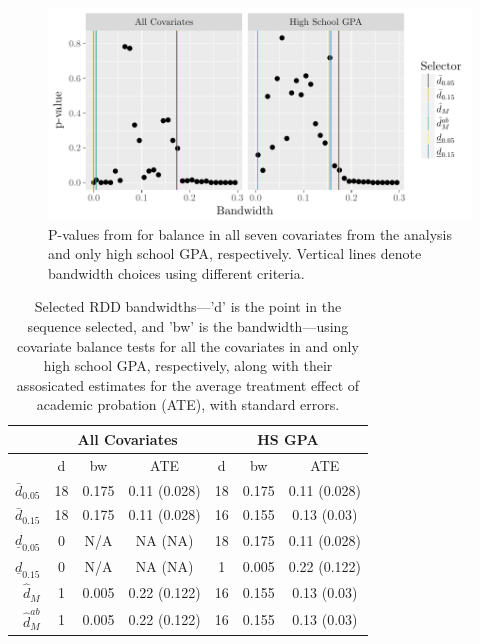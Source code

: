 \documentclass[sts]{imsart}\usepackage[]{graphicx}\usepackage[]{color}
\makeatletter
\def\maxwidth{ %
  \ifdim\Gin@nat@width>\linewidth
    \linewidth
  \else
    \Gin@nat@width
  \fi
}
\newenvironment{knitrout}{}{} %
\newcommand{\dhatm}{\hat{d}_M}
\newcommand{\dhatmab}{\hat{d}^{ab}_M}
\makeatother
\begin{document}
\begin{figure}
\begin{knitrout}
\color{fgcolor}
\includegraphics[width=\maxwidth]{figure/rdd-1} 

\end{knitrout}
\caption{P-values from for balance in all seven covariates
  from the \citet{lso} analysis and only high school GPA, respectively. Vertical lines denote bandwidth choices using
  different criteria.}
\label{fig:rdpvalues1}
\end{figure}

\begin{table}[ht]
\centering
\begin{tabular}{r|ccc|ccc|}
  & \multicolumn{3}{c}{All Covariates}&\multicolumn{3}{c}{HS GPA}\\
 \hline
 & d & bw & ATE & d & bw & ATE \\ 
  \hline
$\bar{d}_{0.05}$ & 18 & 0.175 & 0.11 (0.028) & 18 & 0.175 & 0.11 (0.028) \\ 
  $\bar{d}_{0.15}$ & 18 & 0.175 & 0.11 (0.028) & 16 & 0.155 & 0.13 (0.03) \\ 
  $\underline{d}_{0.05}$ & 0 & N/A & NA (NA) & 18 & 0.175 & 0.11 (0.028) \\ 
  $\underline{d}_{0.15}$ & 0 & N/A & NA (NA) & 1 & 0.005 & 0.22 (0.122) \\ 
  $\dhatm$ & 1 & 0.005 & 0.22 (0.122) & 16 & 0.155 & 0.13 (0.03) \\ 
  $\dhatmab$ & 1 & 0.005 & 0.22 (0.122) & 16 & 0.155 & 0.13 (0.03) \\ 
   \hline
\end{tabular}
\caption{Selected RDD bandwidths---'d' is the point in the sequence selected, and 'bw' is the bandwidth---using covariate balance tests for all the covariates in \citet{lso} and only high school GPA, respectively, along with their assosicated estimates for the average treatment effect of academic probation (ATE), with standard errors.} 
\label{tab:RDD}
\end{table}
\end{document}
